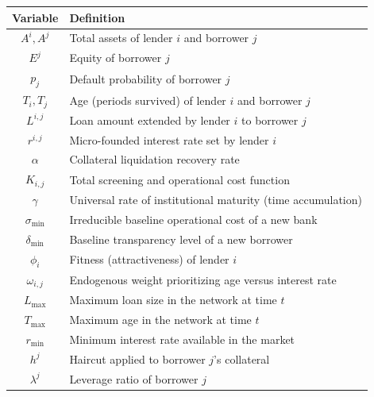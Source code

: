 \documentclass{article}
\begin{document}
\begin{center}
\begin{tabular}{cl}
\hline
\textbf{Variable} & \textbf{Definition} \\
\hline
$A^i, A^j$ & Total assets of lender $i$ and borrower $j$ \\
$E^j$ & Equity of borrower $j$ \\
$p_j$ & Default probability of borrower $j$ \\
$T_i, T_j$ & Age (periods survived) of lender $i$ and borrower $j$ \\
$L^{i,j}$ & Loan amount extended by lender $i$ to borrower $j$ \\
$r^{i,j}$ & Micro-founded interest rate set by lender $i$ \\
$\alpha$ & Collateral liquidation recovery rate \\
$K_{i,j}$ & Total screening and operational cost function \\
$\gamma$ & Universal rate of institutional maturity (time accumulation) \\
$\sigma_{\min}$ & Irreducible baseline operational cost of a new bank \\
$\delta_{\min}$ & Baseline transparency level of a new borrower \\
$\phi_i$ & Fitness (attractiveness) of lender $i$ \\
$\omega_{i,j}$ & Endogenous weight prioritizing age versus interest rate \\
$L_{\max}$ & Maximum loan size in the network at time $t$ \\
$T_{\max}$ & Maximum age in the network at time $t$ \\
$r_{\min}$ & Minimum interest rate available in the market \\
$h^j$ & Haircut applied to borrower $j$'s collateral \\
$\lambda^j$ & Leverage ratio of borrower $j$ \\
\hline
\end{tabular}
\end{center}
\end{document}
